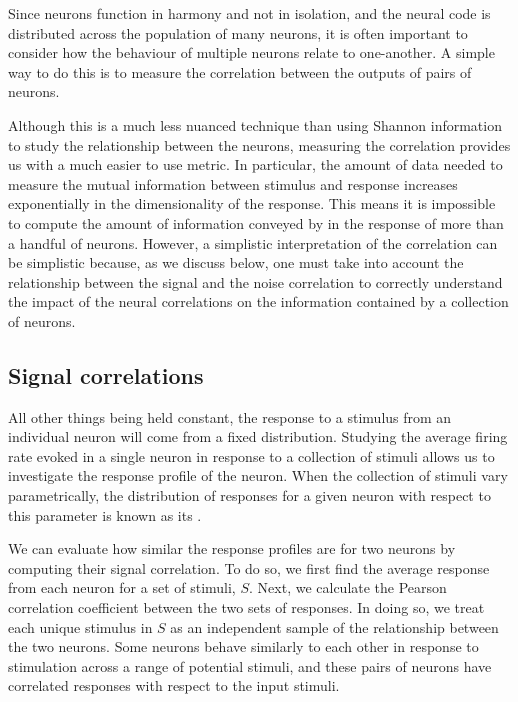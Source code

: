 Since neurons function in harmony and not in isolation, and the neural code is distributed across the population of many neurons, it is often important to consider how the behaviour of multiple neurons relate to one-another.
A simple way to do this is to measure the correlation between the outputs of pairs of neurons.

Although this is a much less nuanced technique than using Shannon information to study the relationship between the neurons, measuring the correlation provides us with a much easier to use metric.
In particular, the amount of data needed to measure the mutual information between stimulus and response increases exponentially in the dimensionality of the response.
This means it is impossible to compute the amount of information conveyed by in the response of more than a handful of neurons.
However, a simplistic interpretation of the correlation can be simplistic because, as we discuss below, one must take into account the relationship between the signal and the noise correlation to correctly understand the impact of the neural correlations on the information contained by a collection of neurons.


\subsection{Signal correlations}
\label{sec:bg-sigcorr}

All other things being held constant, the response to a stimulus from an individual neuron will come from a fixed distribution.
Studying the average firing rate evoked in a single neuron in response to a collection of stimuli allows us to investigate the response profile of the neuron.
When the collection of stimuli vary parametrically, the distribution of responses for a given neuron with respect to this parameter is known as its .

We can evaluate how similar the response profiles are for two neurons by computing their signal correlation.
To do so, we first find the average response from each neuron for a set of stimuli, $S$.
Next, we calculate the Pearson correlation coefficient between the two sets of responses.
In doing so, we treat each unique stimulus in $S$ as an independent sample of the relationship between the two neurons.
Some neurons behave similarly to each other in response to stimulation across a range of potential stimuli, and these pairs of neurons have correlated responses with respect to the input stimuli.

